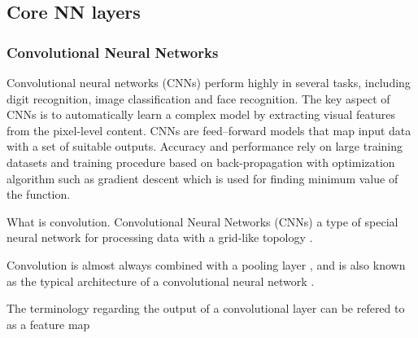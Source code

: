 \subsection{Core NN layers}
\subsubsection{Convolutional Neural Networks}
Convolutional neural networks (CNNs) perform highly in several tasks, including digit recognition, image classification and face recognition. The key aspect of CNNs is to automatically learn a complex model by extracting visual features from the pixel-level content.
CNNs are feed–forward models that map input data with a set of suitable outputs. 
Accuracy and performance rely on large training datasets and training procedure based on back-propagation with optimization algorithm such as gradient descent which is used for finding minimum value of the function.\citep{Acquarelli2017}

What is convolution. 
Convolutional Neural Networks (CNNs) a type of special neural network for processing data with a grid-like topology \citep{Goodfellow2016}. 

Convolution is almost always combined with a pooling layer \citep{Goodfellow2016}, and is also known as the typical architecture of a convolutional neural network \citep{LeCun2015}.  

The terminology regarding the output of a convolutional layer can be refered to as a feature map \citep{Goodfellow2016} 




